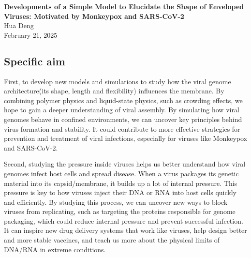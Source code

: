 \documentclass[12pt]{article}
\begin{document}
\doublespacing


\begin{center}
{\Large \textbf{Developments of a Simple Model to Elucidate the Shape of Enveloped Viruses: Motivated by Monkeypox and SARS-CoV-2}}\\[1.5ex]
{\normalsize  Hua Deng}\\

{\normalsize February 21, 2025}
\end{center}





\begin{flushleft}
\setlength{\parindent}{30pt}
\section*{Specific aim}
First, to develop new models and simulations to study how the viral genome architecture(its shape, length and flexibility) influences the membrane. By combining polymer physics and liquid-state physics, such as crowding effects, we hope to gain a deeper understanding of viral assembly. By simulating how viral genomes behave in confined environments, we can uncover key principles behind virus formation and stability. It could contribute to more effective strategies for prevention and treatment of viral infections, especially for viruses like Monkeypox and SARS-CoV-2.


Second, studying the pressure inside viruses helps us better understand how viral genomes infect host cells and spread disease. When a virus packages its genetic material into its capsid/membrane, it builds up a lot of internal pressure. This pressure is key to how viruses inject their DNA or RNA into host cells quickly and efficiently. By studying this process, we can uncover new ways to block viruses from replicating, such as targeting the proteins responsible for genome packaging, which could reduce internal pressure and prevent successful infection. It can inspire new drug delivery systems that work like viruses, help design better and more stable vaccines, and teach us more about the physical limits of DNA/RNA in extreme conditions.

\vspace{-1em} 

\end{flushleft}
\end{document}
